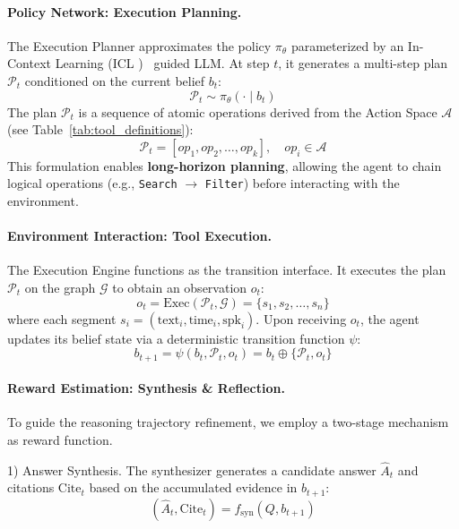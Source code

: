 \documentclass[11pt]{article}
\begin{document}
\paragraph{Policy Network: Execution Planning.}
The Execution Planner approximates the policy $\pi_\theta$ parameterized by an In-Context Learning (ICL )~\cite{dong-etal-2024-survey-icl} guided LLM. At step $t$, it generates a multi-step plan $\mathcal{P}_t$ conditioned on the current belief $b_t$:
\begin{equation}
    \mathcal{P}_t \sim \pi_\theta(\cdot \mid b_t)
\end{equation}
The plan $\mathcal{P}_t$ is a sequence of atomic operations derived from the Action Space $\mathcal{A}$ (see Table~\ref{tab:tool_definitions}):
\begin{equation}
    \mathcal{P}_t = [op_1, op_2, \dots, op_k], \quad op_i \in \mathcal{A}
\end{equation}
This formulation enables \textbf{long-horizon planning}, allowing the agent to chain logical operations (e.g., \texttt{Search} $\to$ \texttt{Filter}) before interacting with the environment.

\paragraph{Environment Interaction: Tool Execution.}
The Execution Engine functions as the transition interface. It executes the plan $\mathcal{P}_t$ on the graph $\mathcal{G}$ to obtain an observation $o_t$:
\begin{equation}
    o_t = \text{Exec}(\mathcal{P}_t, \mathcal{G}) = \{s_1, s_2, \dots, s_n\}
\end{equation}
where each segment $s_i = (\text{text}_i, \text{time}_i, \text{spk}_i)$.
Upon receiving $o_t$, the agent updates its belief state via a deterministic transition function $\psi$:
\begin{equation}
    b_{t+1} = \psi(b_t, \mathcal{P}_t, o_t) = b_t \oplus \{\mathcal{P}_t, o_t\}
\end{equation}

\paragraph{Reward Estimation: Synthesis \& Reflection.}
To guide the reasoning trajectory refinement, we employ a two-stage mechanism as reward function.

1) Answer Synthesis.
The synthesizer generates a candidate answer $\hat{A}_t$ and citations $\text{Cite}_t$ based on the accumulated evidence in $b_{t+1}$:
\begin{equation}
    (\hat{A}_t, \text{Cite}_t) = f_{\text{syn}}(Q, b_{t+1})
\end{equation}
\end{document}
